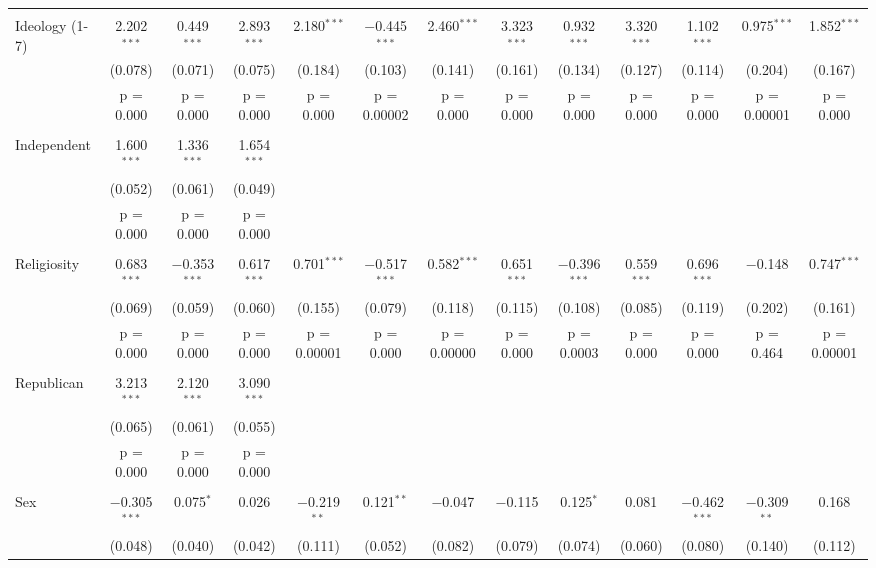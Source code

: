 \documentclass{article}
\begin{document}
\begin{landscape}
\begin{longtable}{@{\extracolsep{5pt}}lcccccccccccc}
  & & & & & & & & & & & & \\ 
 Ideology (1-7) & 2.202$^{***}$ & 0.449$^{***}$ & 2.893$^{***}$ & 2.180$^{***}$ & $-$0.445$^{***}$ & 2.460$^{***}$ & 3.323$^{***}$ & 0.932$^{***}$ & 3.320$^{***}$ & 1.102$^{***}$ & 0.975$^{***}$ & 1.852$^{***}$ \\ 
  & (0.078) & (0.071) & (0.075) & (0.184) & (0.103) & (0.141) & (0.161) & (0.134) & (0.127) & (0.114) & (0.204) & (0.167) \\ 
  & p = 0.000 & p = 0.000 & p = 0.000 & p = 0.000 & p = 0.00002 & p = 0.000 & p = 0.000 & p = 0.000 & p = 0.000 & p = 0.000 & p = 0.00001 & p = 0.000 \\ 
  & & & & & & & & & & & & \\ 
 Independent & 1.600$^{***}$ & 1.336$^{***}$ & 1.654$^{***}$ &  &  &  &  &  &  &  &  &  \\ 
  & (0.052) & (0.061) & (0.049) &  &  &  &  &  &  &  &  &  \\ 
  & p = 0.000 & p = 0.000 & p = 0.000 &  &  &  &  &  &  &  &  &  \\ 
  & & & & & & & & & & & & \\ 
 Religiosity & 0.683$^{***}$ & $-$0.353$^{***}$ & 0.617$^{***}$ & 0.701$^{***}$ & $-$0.517$^{***}$ & 0.582$^{***}$ & 0.651$^{***}$ & $-$0.396$^{***}$ & 0.559$^{***}$ & 0.696$^{***}$ & $-$0.148 & 0.747$^{***}$ \\ 
  & (0.069) & (0.059) & (0.060) & (0.155) & (0.079) & (0.118) & (0.115) & (0.108) & (0.085) & (0.119) & (0.202) & (0.161) \\ 
  & p = 0.000 & p = 0.000 & p = 0.000 & p = 0.00001 & p = 0.000 & p = 0.00000 & p = 0.000 & p = 0.0003 & p = 0.000 & p = 0.000 & p = 0.464 & p = 0.00001 \\ 
  & & & & & & & & & & & & \\ 
 Republican & 3.213$^{***}$ & 2.120$^{***}$ & 3.090$^{***}$ &  &  &  &  &  &  &  &  &  \\ 
  & (0.065) & (0.061) & (0.055) &  &  &  &  &  &  &  &  &  \\ 
  & p = 0.000 & p = 0.000 & p = 0.000 &  &  &  &  &  &  &  &  &  \\ 
  & & & & & & & & & & & & \\ 
 Sex & $-$0.305$^{***}$ & 0.075$^{*}$ & 0.026 & $-$0.219$^{**}$ & 0.121$^{**}$ & $-$0.047 & $-$0.115 & 0.125$^{*}$ & 0.081 & $-$0.462$^{***}$ & $-$0.309$^{**}$ & 0.168 \\ 
  & (0.048) & (0.040) & (0.042) & (0.111) & (0.052) & (0.082) & (0.079) & (0.074) & (0.060) & (0.080) & (0.140) & (0.112) \\ 

\end{longtable}
\end{landscape}
\end{document}
